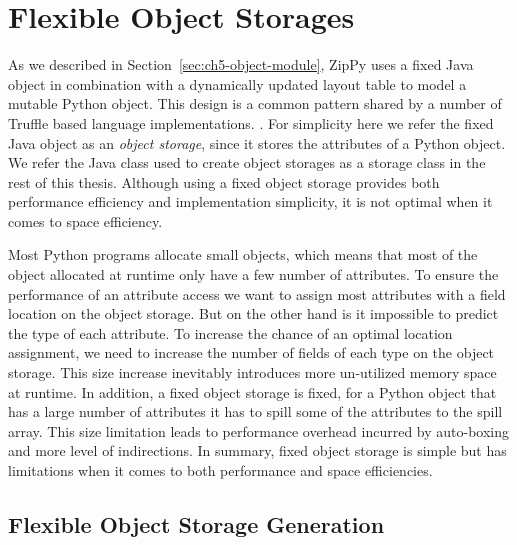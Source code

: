 \section{Flexible Object Storages}
\label{sec:ch5-flexible-object-storages}

As we described in Section~\ref{sec:ch5-object-module}, ZipPy uses a fixed Java object in combination with a dynamically updated layout table to model a mutable Python object.
This design is a common pattern shared by a number of Truffle based language implementations.
.
For simplicity here we refer the fixed Java object as an \emph{object storage}, since it stores the attributes of a Python object.
We refer the Java class used to create object storages as a storage class in the rest of this thesis.
Although using a fixed object storage provides both performance efficiency and implementation simplicity, it is not optimal when it comes to space efficiency.

Most Python programs allocate small objects, which means that most of the object allocated at runtime only have a few number of attributes.
To ensure the performance of an attribute access we want to assign most attributes with a field location on the object storage.
But on the other hand is it impossible to predict the type of each attribute.
To increase the chance of an optimal location assignment, we need to increase the number of fields of each type on the object storage.
This size increase inevitably introduces more un-utilized memory space at runtime.
In addition, a fixed object storage is fixed, for a Python object that has a large number of attributes it has to spill some of the attributes to the spill array.
This size limitation leads to performance overhead incurred by auto-boxing and more level of indirections.
In summary, fixed object storage is simple but has limitations when it comes to both performance and space efficiencies.

\subsection{Flexible Object Storage Generation}
\label{sec:ch5-flexible-object-storage-generation}

